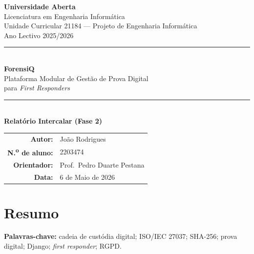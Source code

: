 \documentclass[a4paper,11pt]{article}
\begin{document}

\begin{titlepage}
\centering
\vspace*{1cm}

{\large\bfseries Universidade Aberta}\\[0.3em]
{\large Licenciatura em Engenharia Informática}\\[0.3em]
{\large Unidade Curricular 21184 --- Projeto de Engenharia Informática}\\[0.3em]
{\large Ano Lectivo 2025/2026}\\[2cm]

\rule{\textwidth}{0.4pt}\\[0.6em]
{\Huge\bfseries ForensiQ}\\[0.4em]
{\Large Plataforma Modular de Gestão de Prova Digital\\
para \emph{First Responders}}\\[0.6em]
\rule{\textwidth}{0.4pt}\\[1.5cm]

{\large\bfseries Relatório Intercalar (Fase 2)}\\[2cm]

\begin{tabular}{rl}
\textbf{Autor:}       & João Rodrigues \\
\textbf{N.\textsuperscript{o} de aluno:} & 2203474 \\
\textbf{Orientador:}  & Prof.~Pedro Duarte Pestana \\
\textbf{Data:}        & 6 de Maio de 2026 \\
\end{tabular}

\vfill
\end{titlepage}

\thispagestyle{plain}
\section*{Resumo}


\noindent\textbf{Palavras-chave:} cadeia de custódia digital; ISO/IEC 27037; SHA-256; prova digital; Django; \emph{first responder}; RGPD.

\newpage
\end{document}
